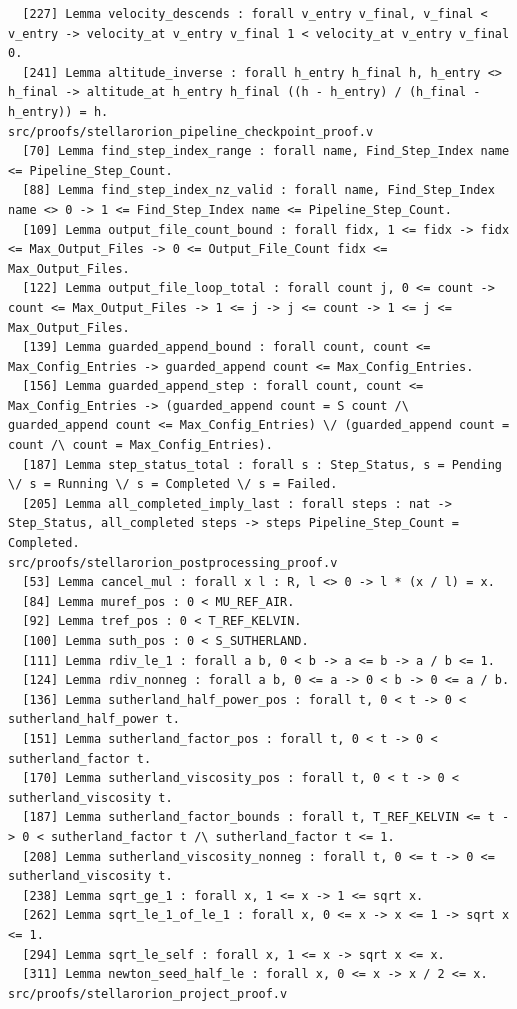 \documentclass[11pt]{article}
\theoremstyle{definition}
\begin{document}
\begin{verbatim}
  [227] Lemma velocity_descends : forall v_entry v_final, v_final < v_entry -> velocity_at v_entry v_final 1 < velocity_at v_entry v_final 0.
  [241] Lemma altitude_inverse : forall h_entry h_final h, h_entry <> h_final -> altitude_at h_entry h_final ((h - h_entry) / (h_final - h_entry)) = h.
src/proofs/stellarorion_pipeline_checkpoint_proof.v
  [70] Lemma find_step_index_range : forall name, Find_Step_Index name <= Pipeline_Step_Count.
  [88] Lemma find_step_index_nz_valid : forall name, Find_Step_Index name <> 0 -> 1 <= Find_Step_Index name <= Pipeline_Step_Count.
  [109] Lemma output_file_count_bound : forall fidx, 1 <= fidx -> fidx <= Max_Output_Files -> 0 <= Output_File_Count fidx <= Max_Output_Files.
  [122] Lemma output_file_loop_total : forall count j, 0 <= count -> count <= Max_Output_Files -> 1 <= j -> j <= count -> 1 <= j <= Max_Output_Files.
  [139] Lemma guarded_append_bound : forall count, count <= Max_Config_Entries -> guarded_append count <= Max_Config_Entries.
  [156] Lemma guarded_append_step : forall count, count <= Max_Config_Entries -> (guarded_append count = S count /\ guarded_append count <= Max_Config_Entries) \/ (guarded_append count = count /\ count = Max_Config_Entries).
  [187] Lemma step_status_total : forall s : Step_Status, s = Pending \/ s = Running \/ s = Completed \/ s = Failed.
  [205] Lemma all_completed_imply_last : forall steps : nat -> Step_Status, all_completed steps -> steps Pipeline_Step_Count = Completed.
src/proofs/stellarorion_postprocessing_proof.v
  [53] Lemma cancel_mul : forall x l : R, l <> 0 -> l * (x / l) = x.
  [84] Lemma muref_pos : 0 < MU_REF_AIR.
  [92] Lemma tref_pos : 0 < T_REF_KELVIN.
  [100] Lemma suth_pos : 0 < S_SUTHERLAND.
  [111] Lemma rdiv_le_1 : forall a b, 0 < b -> a <= b -> a / b <= 1.
  [124] Lemma rdiv_nonneg : forall a b, 0 <= a -> 0 < b -> 0 <= a / b.
  [136] Lemma sutherland_half_power_pos : forall t, 0 < t -> 0 < sutherland_half_power t.
  [151] Lemma sutherland_factor_pos : forall t, 0 < t -> 0 < sutherland_factor t.
  [170] Lemma sutherland_viscosity_pos : forall t, 0 < t -> 0 < sutherland_viscosity t.
  [187] Lemma sutherland_factor_bounds : forall t, T_REF_KELVIN <= t -> 0 < sutherland_factor t /\ sutherland_factor t <= 1.
  [208] Lemma sutherland_viscosity_nonneg : forall t, 0 <= t -> 0 <= sutherland_viscosity t.
  [238] Lemma sqrt_ge_1 : forall x, 1 <= x -> 1 <= sqrt x.
  [262] Lemma sqrt_le_1_of_le_1 : forall x, 0 <= x -> x <= 1 -> sqrt x <= 1.
  [294] Lemma sqrt_le_self : forall x, 1 <= x -> sqrt x <= x.
  [311] Lemma newton_seed_half_le : forall x, 0 <= x -> x / 2 <= x.
src/proofs/stellarorion_project_proof.v

\end{verbatim}
\end{document}
